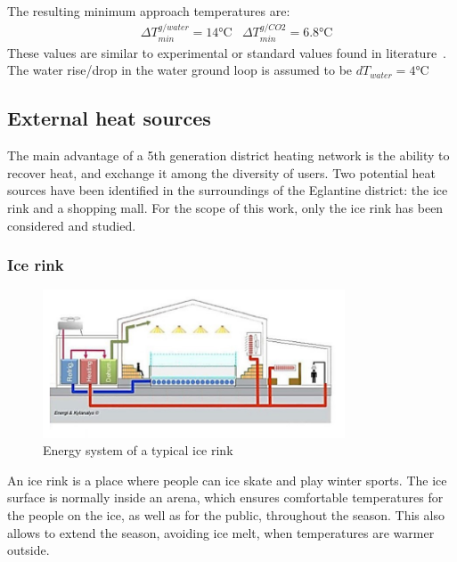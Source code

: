 \documentclass{article}
\begin{document}
The resulting minimum approach temperatures are:
\begin{align}
	&\Delta T_{min}^{g/water} = 14 \si{\celsius}
	&\Delta T_{min}^{g/CO2} = 6.8 \si{\celsius}
\end{align}
These values are similar to experimental or standard values found in literature~\cite{siaSIA384Sondes2010, lamarcheReviewMethodsEvaluate2010}.\\

The water rise/drop in the water ground loop is assumed to be $dT_{water} = 4 \si{\celsius}$~\cite{siaSIA384Sondes2010}\\


\subsection{External heat sources}
The main advantage of a 5th generation district heating network is the ability to recover heat, and exchange it among the diversity of users. 
Two potential heat sources have been identified in the surroundings of the Eglantine district: the ice rink and a shopping mall. For the scope of this work, only the ice rink has been considered and studied.

\subsubsection{Ice rink}

\begin{figure}[htp]
	\centering
	\includegraphics[width=0.8\textwidth]{IR_schema.JPG}
	\caption{Energy system of a typical ice rink~\cite{gronqvistComparativeLifecycleCost2016}}
	\label{fig:IR_schema}
\end{figure}

An ice rink is a place where people can ice skate and play winter sports. The ice surface is normally inside an arena, which ensures comfortable temperatures for the people on the ice, as well as for the public, throughout the season. This also allows to extend the season, avoiding ice melt, when temperatures are warmer outside.\\
\end{document}
